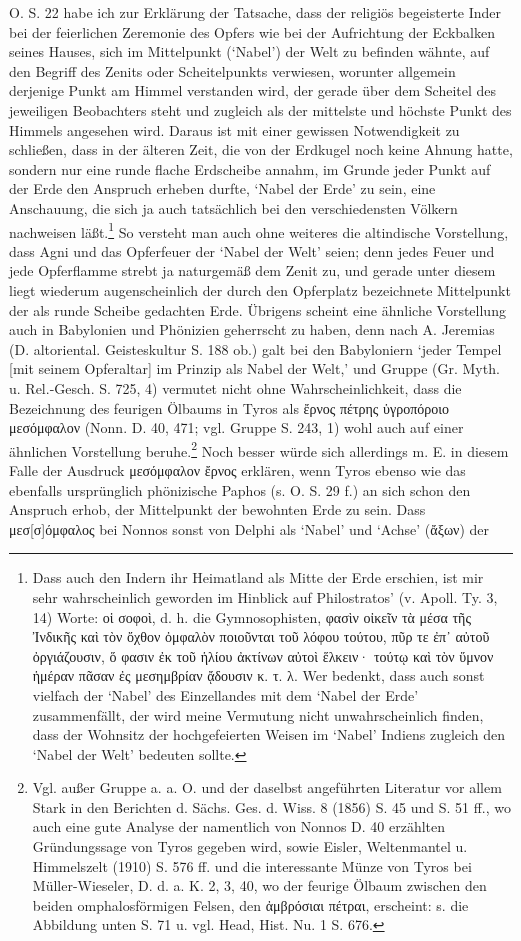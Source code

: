 \documentclass[a4paper, 11pt, oneside]{article}
\begin{document}
O. S. 22 habe ich zur Erklärung der Tatsache, dass der religiös begeisterte Inder bei der feierlichen Zeremonie des Opfers wie bei der Aufrichtung der Eckbalken seines Hauses, sich im Mittelpunkt (`Nabel') der Welt zu befinden wähnte, auf den Begriff des Zenits oder Scheitelpunkts verwiesen, worunter allgemein derjenige Punkt am Himmel verstanden wird, der gerade über dem Scheitel des jeweiligen Beobachters steht und zugleich als der mittelste und höchste Punkt des Himmels angesehen wird. Daraus ist mit einer gewissen Notwendigkeit zu schließen, dass in der älteren Zeit, die von der Erdkugel noch keine Ahnung hatte, sondern nur eine runde flache Erdscheibe annahm, im Grunde jeder Punkt auf der Erde den Anspruch erheben durfte, `Nabel der Erde' zu sein, eine Anschauung, die sich ja auch tatsächlich bei den verschiedensten Völkern nachweisen läßt.\footnote{Dass auch den Indern ihr Heimatland als Mitte der Erde erschien, ist mir sehr wahrscheinlich geworden im Hinblick auf Philostratos' (v. Apoll. Ty. 3, 14) Worte: οἱ σοφοὶ, d. h. die Gymnosophisten, φασὶν οἰκεῖν τὰ μέσα τῆς Ἰνδικῆς καὶ τὸν ὄχθον ὀμφαλὸν ποιοῦνται τοῦ λόφου τούτου, πῦρ τε ἐπ᾽ αὐτοῦ ὀργιάζουσιν, ὅ φασιν ἐκ τοῦ ἡλίου ἀκτίνων αὐτοὶ ἕλκειν· τούτῳ καὶ τὸν ὕμνον ἡμέραν πᾶσαν ἐς μεσημβρίαν ᾄδουσιν κ. τ. λ. Wer bedenkt, dass auch sonst vielfach der `Nabel' des Einzellandes mit dem `Nabel der Erde' zusammenfällt, der wird meine Vermutung nicht unwahrscheinlich finden, dass der Wohnsitz der hochgefeierten Weisen im `Nabel' Indiens zugleich den `Nabel der Welt' bedeuten sollte.} So versteht man auch ohne weiteres die altindische Vorstellung, dass Agni und das Opferfeuer der `Nabel der Welt' seien; denn jedes Feuer und jede Opferflamme strebt ja naturgemäß dem Zenit zu, und gerade unter diesem liegt wiederum augenscheinlich der durch den Opferplatz bezeichnete Mittelpunkt der als runde Scheibe gedachten Erde. Übrigens scheint eine ähnliche Vorstellung auch in Babylonien und Phönizien geherrscht zu haben, denn nach A. Jeremias (D. altoriental. Geisteskultur S. 188 ob.) galt bei den Babyloniern `jeder Tempel [mit seinem Opferaltar] im Prinzip als Nabel der Welt,' und Gruppe (Gr. Myth. u. Rel.-Gesch. S. 725, 4) vermutet nicht ohne Wahrscheinlichkeit, dass die Bezeichnung des feurigen Ölbaums in Tyros als ἔρνος πέτρης ὑγροπόροιο μεσόμφαλον (Nonn. D. 40, 471; vgl. Gruppe S. 243, 1) wohl auch auf einer ähnlichen Vorstellung beruhe.\footnote{Vgl. außer Gruppe a. a. O. und der daselbst angeführten Literatur vor allem Stark in den Berichten d. Sächs. Ges. d. Wiss. 8 (1856) S. 45 und S. 51 ff., wo auch eine gute Analyse der namentlich von Nonnos D. 40 erzählten Gründungssage von Tyros gegeben wird, sowie Eisler, Weltenmantel u. Himmelszelt (1910) S. 576 ff. und die interessante Münze von Tyros bei Müller-Wieseler, D. d. a. K. 2, 3, 40, wo der feurige Ölbaum zwischen den beiden omphalosförmigen Felsen, den ἀμβρόσιαι πέτραι, erscheint: s. die Abbildung unten S. 71 u. vgl. Head, Hist. Nu. 1 S. 676.} Noch besser würde sich allerdings m. E. in diesem Falle der Ausdruck μεσόμφαλον ἔρνος erklären, wenn Tyros ebenso wie das ebenfalls ursprünglich phönizische Paphos (s. O. S. 29 f.) an sich schon den Anspruch erhob, der Mittelpunkt der bewohnten Erde zu sein. Dass μεσ[σ]όμφαλος bei Nonnos sonst von Delphi als `Nabel' und `Achse' (ἄξων) der 
\end{document}
